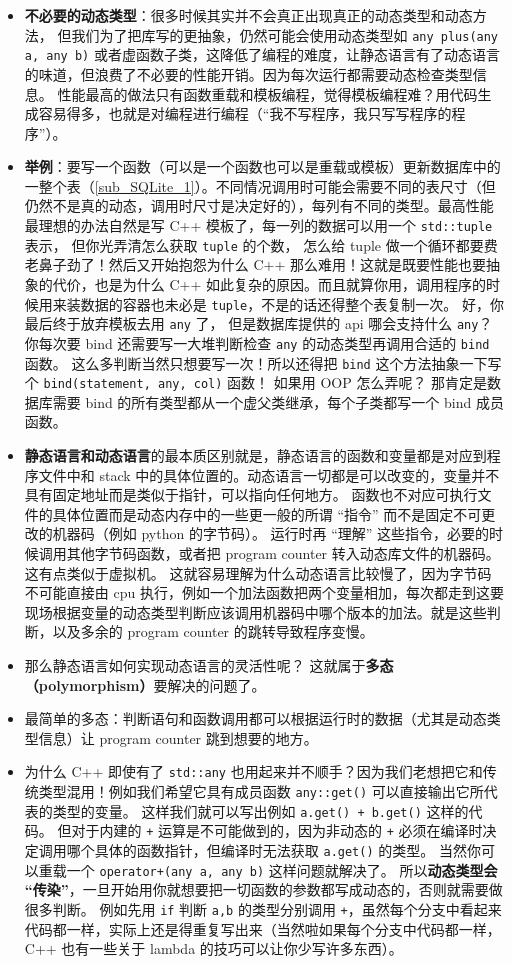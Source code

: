 \begin{itemize}
\item \textbf{不必要的动态类型}：很多时候其实并不会真正出现真正的动态类型和动态方法， 但我们为了把库写的更抽象，仍然可能会使用动态类型如 \verb`any plus(any a, any b)` 或者虚函数子类，这降低了编程的难度，让静态语言有了动态语言的味道，但浪费了不必要的性能开销。因为每次运行都需要动态检查类型信息。 性能最高的做法只有函数重载和模板编程，觉得模板编程难？用代码生成容易得多，也就是对编程进行编程（“我不写程序，我只写写程序的程序”）。
\item \textbf{举例}：要写一个函数（可以是一个函数也可以是重载或模板）更新数据库中的一整个表（\autoref{sub_SQLite_1}）。不同情况调用时可能会需要不同的表尺寸（但仍然不是真的动态，调用时尺寸是决定好的），每列有不同的类型。最高性能最理想的办法自然是写 C++ 模板了，每一列的数据可以用一个 \verb`std::tuple` 表示， 但你光弄清怎么获取 \verb`tuple` 的个数， 怎么给 tuple 做一个循环都要费老鼻子劲了！然后又开始抱怨为什么 C++ 那么难用！这就是既要性能也要抽象的代价，也是为什么 C++ 如此复杂的原因。而且就算你用，调用程序的时候用来装数据的容器也未必是 \verb`tuple`，不是的话还得整个表复制一次。 好，你最后终于放弃模板去用 \verb`any` 了， 但是数据库提供的 api 哪会支持什么 \verb`any`？ 你每次要 bind 还需要写一大堆判断检查 \verb`any` 的动态类型再调用合适的 \verb`bind` 函数。 这么多判断当然只想要写一次！所以还得把 \verb`bind` 这个方法抽象一下写个 \verb`bind(statement, any, col)` 函数！ 如果用 OOP 怎么弄呢？ 那肯定是数据库需要 bind 的所有类型都从一个虚父类继承，每个子类都写一个 bind 成员函数。
\item \textbf{静态语言和动态语言}的最本质区别就是，静态语言的函数和变量都是对应到程序文件中和 stack 中的具体位置的。动态语言一切都是可以改变的，变量并不具有固定地址而是类似于指针，可以指向任何地方。 函数也不对应可执行文件的具体位置而是动态内存中的一些更一般的所谓 “指令” 而不是固定不可更改的机器码（例如 python 的字节码）。 运行时再 “理解” 这些指令，必要的时候调用其他字节码函数，或者把 program counter 转入动态库文件的机器码。 这有点类似于虚拟机。 这就容易理解为什么动态语言比较慢了，因为字节码不可能直接由 cpu 执行，例如一个加法函数把两个变量相加，每次都走到这要现场根据变量的动态类型判断应该调用机器码中哪个版本的加法。就是这些判断，以及多余的 program counter 的跳转导致程序变慢。
\item 那么静态语言如何实现动态语言的灵活性呢？ 这就属于\textbf{多态（polymorphism）}要解决的问题了。
\item 最简单的多态：判断语句和函数调用都可以根据运行时的数据（尤其是动态类型信息）让 program counter 跳到想要的地方。
\item 为什么 C++ 即使有了 \verb`std::any` 也用起来并不顺手？因为我们老想把它和传统类型混用！例如我们希望它具有成员函数 \verb`any::get()` 可以直接输出它所代表的类型的变量。 这样我们就可以写出例如 \verb`a.get() + b.get()` 这样的代码。 但对于内建的 \verb`+` 运算是不可能做到的，因为非动态的 \verb`+` 必须在编译时决定调用哪个具体的函数指针，但编译时无法获取 \verb`a.get()` 的类型。 当然你可以重载一个 \verb`operator+(any a, any b)` 这样问题就解决了。 所以\textbf{动态类型会 “传染”}，一旦开始用你就想要把一切函数的参数都写成动态的，否则就需要做很多判断。 例如先用 \verb`if` 判断 \verb`a,b` 的类型分别调用 \verb`+`，虽然每个分支中看起来代码都一样，实际上还是得重复写出来（当然啦如果每个分支中代码都一样， C++ 也有一些关于 lambda 的技巧可以让你少写许多东西）。
\end{itemize}
